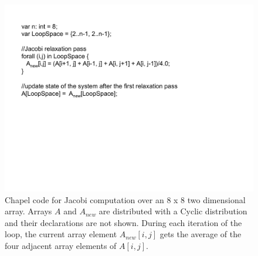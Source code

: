 \begin{figure}
	\begin{center}
	\includegraphics[scale=0.55]{./Figures/jacobi}
	\caption{Chapel code for Jacobi computation over an 8 x 8 two dimensional array. Arrays $A$ and $A_{new}$ are distributed with a Cyclic distribution and their declarations are not shown. During each iteration of the loop, the current array element $A_{new}[i, j]$ gets the average of the four adjacent array elements of $A[i, j]$.}
	\label{jacobi_code}
	\end{center}
\end{figure}